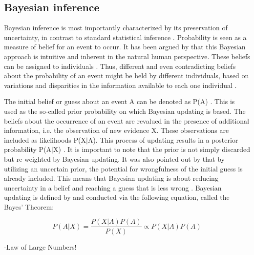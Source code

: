        \subsection{Bayesian inference}
        Bayesian inference is most importantly characterized by its preservation of uncertainty, in contrast to standard statistical inference \citep{davidson2015}. Probability is seen as a measure of belief for an event to occur. It has been argued by \cite{davidson2015}  that this Bayesian approach is intuitive and inherent in the natural human perspective. These beliefs can be assigned to individuals \citep{davidson2015}. Thus, different and even contradicting beliefs about the probability of an event might be held by different individuals, based on variations and disparities in the information available to each one individual \citep{davidson2015}.
        
        The initial belief or guess about an event A can be denoted as P(A) \citep{davidson2015}. This is used as the so-called prior probability on which Bayesian updating is based. The beliefs about the occurrence of an event are revalued in the presence of additional information, i.e. the observation of new evidence X. These observations are included as likelihoods P(X$|$A). This process of updating results in a posterior probability P(A$|$X) \citep{davidson2015}. It is important to note that the prior is not simply discarded but re-weighted by Bayesian updating. It was also pointed out by \citet{davidson2015} that by utilizing an uncertain prior, the potential for wrongfulness of the initial guess is already included. This means that Bayesian updating is about reducing uncertainty in a belief and reaching a guess that is less wrong \citep{davidson2015}.
        Bayesian updating is defined by and conducted via the following equation, called the Bayes' Theorem:
        
        \begin{equation}\label{eq:BayesTheorem}
        P(A|X) = \frac{P(X|A)P(A)}{P(X)}
        \propto P(X|A)P(A)
        \end{equation}
     
        -Law of Large Numbers!
                
